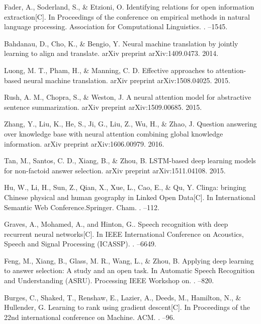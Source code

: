 \begin{thebibliography}{10}
Fader, A., Soderland, S., \& Etzioni, O.
\newblock Identifying relations for open information extraction[C].
\newblock In Proceedings of the conference on empirical methods in natural language processing. Association for Computational Linguistics.
.
--1545.

Bahdanau, D., Cho, K., \& Bengio, Y. 
\newblock Neural machine translation by jointly learning to align and translate. arXiv preprint arXiv:1409.0473. 2014.

Luong, M. T., Pham, H., \& Manning, C. D.
\newblock Effective approaches to attention-based neural machine translation. arXiv preprint arXiv:1508.04025. 2015.

Rush, A. M., Chopra, S., \& Weston, J.
\newblock A neural attention model for abstractive sentence summarization. arXiv preprint arXiv:1509.00685. 2015.

Zhang, Y., Liu, K., He, S., Ji, G., Liu, Z., Wu, H., \& Zhao, J. 
\newblock
Question answering over knowledge base with neural attention combining global knowledge information. arXiv preprint arXiv:1606.00979. 2016.

Tan, M., Santos, C. D., Xiang, B., \& Zhou, B.
\newblock LSTM-based deep learning models for non-factoid answer selection. arXiv preprint arXiv:1511.04108. 2015.

Hu, W., Li, H., Sun, Z., Qian, X., Xue, L., Cao, E., \& Qu, Y. 
\newblock Clinga: bringing Chinese physical and human geography in Linked Open Data[C].
\newblock In International Semantic Web Conference.Springer. Cham.
.
--112.

Graves, A., Mohamed, A., and Hinton, G..
\newblock Speech recognition with deep recurrent neural networks[C].
\newblock In IEEE International Conference on Acoustics, Speech and Signal
Processing (ICASSP).
.
--6649.

Feng, M., Xiang, B., Glass, M. R., Wang, L., \& Zhou, B. 
\newblock Applying deep learning to answer selection: A study and an open task.
\newblock In Automatic Speech Recognition and Understanding (ASRU).
Processing IEEE Workshop on.
.
--820.

Burges, C., Shaked, T., Renshaw, E., Lazier, A., Deeds, M., Hamilton, N., \& Hullender, G.
\newblock Learning to rank using gradient descent[C].
\newblock In Proceedings of the 22nd international conference on Machine. ACM.
.
--96.


\end{thebibliography}
